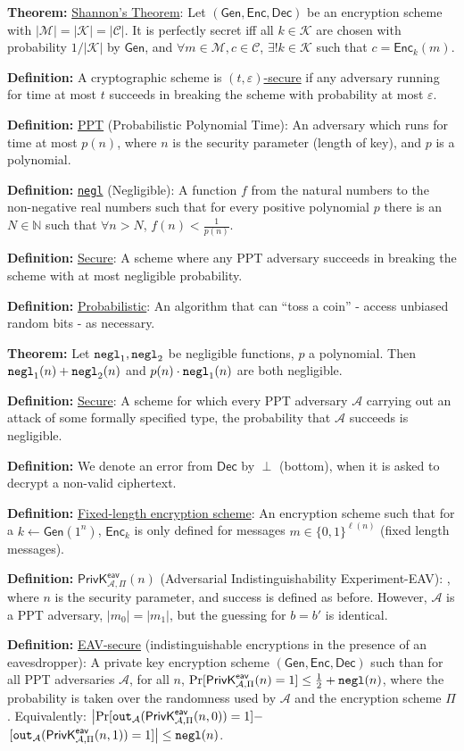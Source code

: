 \documentclass[10pt]{article}
\newcommand{\N}{\mathbb{N}}
\newcommand{\AAA}{\mathcal{A}}
\newcommand{\CCC}{\mathcal{C}}
\newcommand{\KKK}{\mathcal{K}}
\newcommand{\MMM}{\mathcal{M}}
\newcommand{\defn}[1]{{\bf Definition:} \underline{#1}}
\newcommand{\thm}[1]{{\bf Theorem:} \underline{#1}}
\newcommand{\Enc}{\mathsf{Enc}}
\newcommand{\Dec}{\mathsf{Dec}}
\newcommand{\Gen}{\mathsf{Gen}}
\newcommand{\GenEncDec}{(\Gen,\Enc,\Dec)}
\newcommand{\ExptEavArgs}[2]{\mathsf{PrivK}^{\mathsf{eav}}_{#1,#2}}
\newcommand{\ExptEav}{\ExptEavArgs{\AAA}{\Pi}}
\newcommand{\negl}{{\tt negl}}
\newcommand{\from}{\leftarrow}
\begin{document}
\begin{multicols}{4}
\thm{Shannon's Theorem}: Let $\GenEncDec$ be an encryption scheme with $|\MMM|=|\KKK|=|\CCC|$. It is perfectly secret iff all $k\in\KKK$ are chosen with probability $1/|\KKK|$ by $\Gen$, and $\forall m\in\MMM, c\in\CCC$, $\exists!k\in\KKK$ such that $c=\Enc_k(m)$.

\defn{}A cryptographic scheme is \underline{$(t,\varepsilon)$-secure} if any adversary running for time at most $t$ succeeds in breaking the scheme with probability at most $\varepsilon$.

\defn{PPT} (Probabilistic Polynomial Time): An adversary which runs for time at most $p(n)$, where $n$ is the security parameter (length of key), and $p$ is a polynomial.

\defn{\negl} (Negligible): A function $f$ from the natural numbers to the non-negative real numbers such that for every positive polynomial $p$ there is an $N\in\N$ such that $\forall n>N$, $f(n)<\frac{1}{p(n)}$.

\defn{Secure}: A scheme where any PPT adversary succeeds in breaking the scheme with at most negligible probability.

\defn{Probabilistic}: An algorithm that can ``toss a coin'' - access unbiased random bits - as necessary.

\thm{}Let $\negl_1,\negl_2$ be negligible functions, $p$ a polynomial. Then $\negl_1(n)+\negl_2(n)$ and $p(n)\cdot\negl_1(n)$ are both negligible.

\defn{Secure}: A scheme for which every PPT adversary $\AAA$ carrying out an attack of some formally specified type, the probability that $\AAA$ succeeds is negligible.

\defn{}We denote an error from $\Dec$ by $\perp$ (bottom), when it is asked to decrypt a non-valid ciphertext.

\defn{Fixed-length encryption scheme}: An encryption scheme such that for a $k\from\Gen(1^n)$, $\Enc_k$ is only defined for messages $m\in\{0,1\}^{\ell(n)}$ (fixed length messages).

\defn{$\ExptEav(n)$} (Adversarial Indistinguishability Experiment-EAV): , where $n$ is the security parameter, and success is defined as before. However, $\AAA$ is a PPT adversary, $|m_0|=|m_1|$, but the guessing for $b=b'$ is identical.

\defn{EAV-secure} (indistinguishable encryptions in the presence of an eavesdropper): A private key encryption scheme $\GenEncDec$ such than for all PPT adversaries $\AAA$, for all $n$, $\Pr[\ExptEav(n)=1]\leq\frac{1}{2}+\negl(n)$, where the probability is taken over the randomness used by $\AAA$ and the encryption scheme $\Pi$. Equivalently: $\left|\Pr[{\tt out}_{\AAA}(\ExptEav(n,0))=1]-\right.$ $\left.[{\tt out}_{\AAA}(\ExptEav(n,1))=1]\right|\leq\negl(n)$.


\end{multicols}
\end{document}
